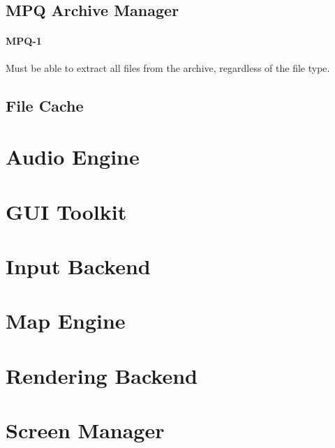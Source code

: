 \requirementreset %



\subsection{MPQ Archive Manager}
\paragraph{MPQ-1}
\begin{indentpar}{1cm}
Must be able to extract all files from the archive, regardless of the file type.
\end{indentpar}



\subsection{File Cache}

\newpage
\subsection{}

\newpage
\section{Audio Engine}

\newpage
\section{GUI Toolkit}

\newpage
\section{Input Backend}

\newpage
\section{Map Engine}

\newpage
\section{Rendering Backend}

\newpage
\section{Screen Manager}

